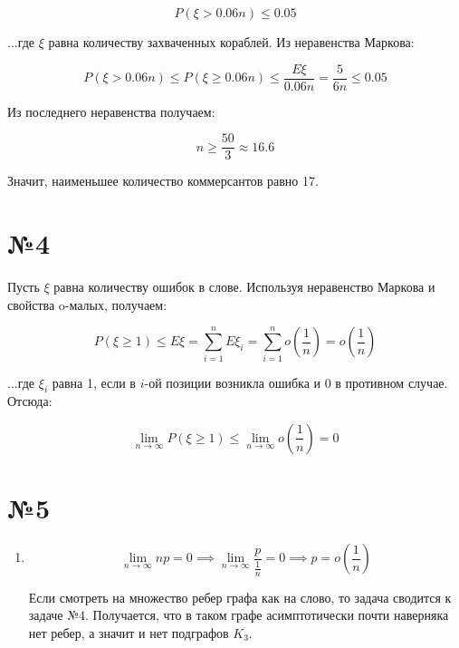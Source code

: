 \documentclass[11pt]{article}
\begin{document}
\begin{sloppypar}
\begin{equation}
  P(\xi > 0.06n) \leq 0.05
\end{equation}

...где $\xi$ равна количеству захваченных кораблей. Из неравенства Маркова:

\begin{equation}
  P(\xi > 0.06n) \leq P(\xi \geq 0.06n) \leq \frac{E\xi}{0.06n} = \frac{5}{6n} \leq 0.05
\end{equation}

Из последнего неравенства получаем:

\begin{equation}
  n \geq \frac{50}{3} \approx 16.6
\end{equation}

Значит, наименьшее количество коммерсантов равно 17.

\section*{№4}
Пусть $\xi$ равна количеству ошибок в слове. Используя неравенство Маркова и свойства o-малых, получаем:

\begin{equation}
  P(\xi \geq 1) \leq E\xi = \sum_{i = 1}^n E\xi_i = \sum_{i = 1}^n o(\frac{1}{n}) = o(\frac{1}{n})
\end{equation}

...где $\xi_i$ равна 1, если в $i$-ой позиции возникла ошибка и 0 в противном случае. Отсюда:

\begin{equation}
  \lim_{n \to \infty} P(\xi \geq 1) \leq \lim_{n \to \infty} o(\frac{1}{n}) = 0
\end{equation}

\section*{№5}
\begin{enumerate}[label=(\alph*)]
\item
  \begin{equation}
    \lim_{n \to \infty} np = 0 \implies \lim_{n \to \infty} \frac{p}{\frac{1}{n}} = 0 \implies p = o(\frac{1}{n})
  \end{equation}
  
  Если смотреть на множество ребер графа как на слово, то задача сводится к задаче №4. Получается, что в таком графе асимптотически почти наверняка нет ребер, а значит и нет подграфов $K_3$.
\end{enumerate}

\end{sloppypar}
\end{document}
